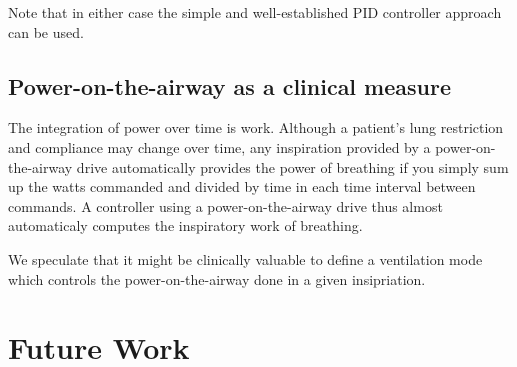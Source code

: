 \documentclass{article}
\begin{document}
Note that in either case the simple and well-established PID controller
approach can be used.

\subsection{Power-on-the-airway as a clinical measure}

The integration of power over time is work. Although a patient's
lung restriction and compliance may change over time, any inspiration
provided by a power-on-the-airway drive automatically provides
the power of breathing if you simply sum up the watts commanded
and divided by time in each time interval between commands.
A controller using a power-on-the-airway drive thus almost
automaticaly computes the inspiratory work of breathing.

We speculate that it might be clinically valuable to
define a ventilation mode which controls the power-on-the-airway
done in a given insipriation.

\section{Future Work}






\end{document}
